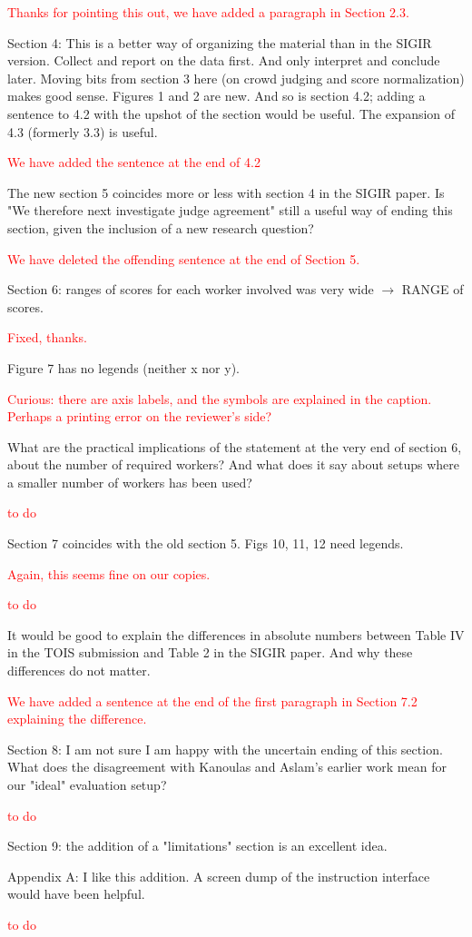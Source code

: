 \documentclass{article}
\newcommand{\comment}[1]{\vspace{1em} \textcolor{red}{{#1}} \vspace{1em}}
\begin{document}
\comment {Thanks for pointing this out, we have added a paragraph in Section 2.3.}

Section 4: This is a better way of organizing the material than in
the SIGIR version. Collect and report on the data first. And only
interpret and conclude later. Moving bits from section 3 here (on
crowd judging and score normalization) makes good sense. Figures 1
and 2 are new. And so is section 4.2; adding a sentence to 4.2 with
the upshot of the section would be useful. The expansion of 4.3
(formerly 3.3) is useful.

\comment {We have added the sentence at the end of 4.2}

The new section 5 coincides more  or less with section 4 in the
SIGIR paper. Is "We therefore next investigate judge agreement"
still a useful  way of ending this section, given the inclusion of
a new research question?

\comment {We have deleted the offending sentence at the end of Section 5.}

Section 6:  ranges of scores for each worker involved was very wide
$\rightarrow$ RANGE of scores. 

\comment {Fixed, thanks.}

Figure 7 has no legends (neither x nor y).

\comment {Curious: there are axis labels, and the symbols are explained
in the caption. Perhaps a printing error on the reviewer's side?} 

What are the practical implications of the statement at the very
end of section 6, about the number of required workers? And what
does it say about setups where a smaller number of workers has been
used?

\comment {to do}

Section 7 coincides with the old section 5. 
Figs 10, 11, 12 need legends. 

\comment {Again, this seems fine on our copies.}

\comment {to do}

It would be good to explain the differences in absolute
numbers between Table IV in the TOIS submission and Table 2 in the
SIGIR paper. And why these differences do not matter.

\comment {We have added a sentence at the end of the first paragraph in Section 7.2 explaining the difference.}

Section 8: I am not sure I am happy with the uncertain ending of
this section. What does the disagreement with Kanoulas and Aslam's
earlier work mean for our "ideal" evaluation setup?

\comment {to do}

Section 9: the addition of a "limitations" section is an excellent
idea.

Appendix A: I like this addition. A screen dump of the instruction
interface would have been helpful.

\comment {to do}
\end{document}
